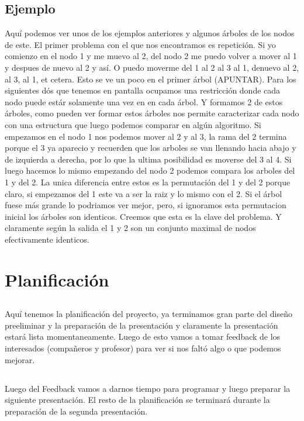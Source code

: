 \documentclass[conference]{IEEEtran}
\begin{document}
\subsection{Ejemplo}
Aquí podemos ver unos de los ejemplos anteriores y algunos árboles de los nodos de este. El primer problema con el que nos encontramos es repetición. Si yo comienzo en el nodo 1 y me muevo al 2, del nodo 2 me puedo volver a mover al 1 y despues de nuevo al 2 y así. O puedo moverme del 1 al 2 al 3 al 1, denuevo al 2, al 3, al 1, et cetera. Esto se ve un poco en el primer árbol (APUNTAR). Para los siguientes dós que tenemos en pantalla ocupamos una restricción donde cada nodo puede estár solamente una vez en en cada árbol. Y formamos 2 de estos árboles, como pueden ver formar estos árboles nos permite caracterizar cada nodo con una estructura que luego podemos comparar en algún algoritmo. Si empezamos en el nodo 1 nos podemos mover al 2 y al 3, la rama del 2 termina porque el 3 ya aparecio y recuerden que los arboles se van llenando hacia abajo y de izquierda a derecha, por lo que la ultima posibilidad es moverse del 3 al 4. Si luego hacemos lo mismo empezando del nodo 2 podemos compara los arboles del 1 y del 2. La unica diferencia entre estos es la permutación del 1 y del 2 porque claro, si empezamos del 1 este va a ser la raiz y lo mismo con el 2. Si el árbol fuese más grande lo podriamos ver mejor, pero, si ignoramos esta permutacion inicial los árboles son identicos. Creemos que esta es la clave del problema. Y claramente según la salida el 1 y 2 son un conjunto maximal de nodos efectivamente identicos.

\section{Planificación}

\subsection{}
 Aquí tenemos la planificación del proyecto, ya terminamos gran parte del diseño preeliminar y la preparación de la presentación y claramente la presentación estará lista momentaneamente. Luego de esto vamos a tomar feedback de los interesados (compañeros y profesor) para ver si nos faltó algo o que podemos mejorar.

\subsection{}
Luego del Feedback vamos a darnos tiempo para programar y luego preparar la siguiente presentación. El resto de la planificación se terminará durante la preparación de la segunda presentación.
\end{document}
